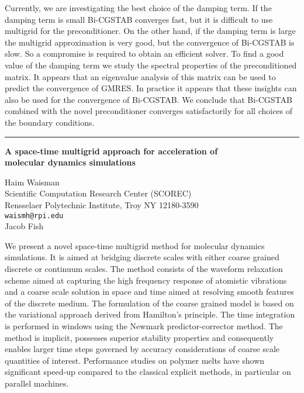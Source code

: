 \documentclass[twosided]{report}
\begin{document}
Currently, we are investigating the best choice of the
damping term. If the damping term is small Bi-CGSTAB
converges fast, but it is difficult to use multigrid for the
preconditioner. On the other hand, if the damping term is
large the multigrid approximation is very good, but the
convergence of Bi-CGSTAB is slow. So a compromise is
required to obtain an efficient solver. To find a good value
of the damping term we study the spectral properties of the
preconditioned matrix. It appears that an eigenvalue 
analysis of this matrix can be used to predict the
convergence of GMRES. In practice it appears that these
insights can also be used for the convergence of Bi-CGSTAB.
We conclude that Bi-CGSTAB combined with the novel
preconditioner converges satisfactorily for all choices of
the boundary conditions.



	\begin{center} \rule{6in}{1pt} \end{center}

\begin{center}
{\large			%
{\bf A space-time multigrid approach for acceleration of \\
	molecular dynamics simulations}}

	Haim Waisman \\
	Scientific Computation Research Center (SCOREC) \\
	Rensselaer Polytechnic Institute,  Troy NY 12180-3590 \\
	{\tt waismh@rpi.edu} \\
	Jacob Fish
\end{center}
We present a novel space-time multigrid method for molecular
dynamics simulations. It is aimed at bridging discrete
scales with either coarse grained discrete or continuum
scales. The method consists of the waveform relaxation
scheme aimed at capturing the high frequency response of
atomistic vibrations and a coarse scale solution in space
and time aimed at resolving smooth features of the discrete
medium. The formulation of the coarse grained model is based
on the variational approach derived from Hamilton's
principle. The time integration is performed in windows
using the Newmark predictor-corrector method. The method is
implicit, possesses superior stability properties and
consequently enables larger time steps governed by accuracy
considerations of coarse scale quantities of interest.
Performance studies on polymer melts have shown significant
speed-up compared to the classical explicit methods, in
particular on parallel machines.
\end{document}
